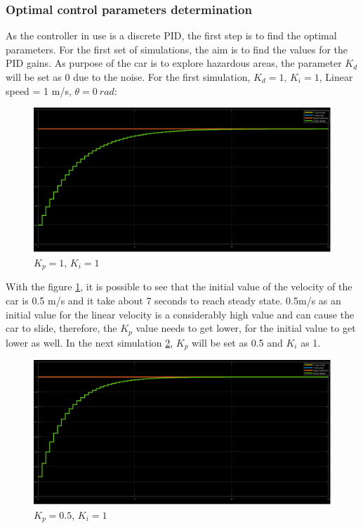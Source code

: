\subsubsection{Optimal control parameters determination}
As the controller in use is a discrete PID, the first step is to find the optimal parameters.
For the first set of simulations, the aim is to find the values for the PID gains. As purpose of the car is to explore hazardous areas, the parameter $K_d$ will be set as 0 due to the noise. 
For the first simulation, $K_d = 1$, $K_i = 1$, Linear speed = 1 m/s, $\theta =
0~\si{rad}$:
\begin{figure}[!h]
\centering
\includegraphics[width=1.0\textwidth]{./img/pid11.png}
\caption {\label{fig:pid1-p1i1}$K_p=1$, $K_i=1$}
\end{figure}
With the figure \ref{fig:pid1-p1i1}, it is possible to see that the initial value of the velocity of the car is 0.5 m/s and it take about 7 seconds to reach steady state. 0.5m/s as an initial value for the linear velocity is a considerably high value and can cause the car to slide, therefore, the $K_p$ value needs to get lower, for the initial value to get lower as well.
In the next simulation \ref{fig:pid1-p05i1}, $K_p$ will be set as 0.5 and $K_i$ as 1.
\begin{figure}[!h]
\centering
\includegraphics[width=1.0\textwidth]{./img/pid051.png}
\caption {\label{fig:pid1-p05i1}$K_p=0.5$, $K_i=1$}
\end{figure}
